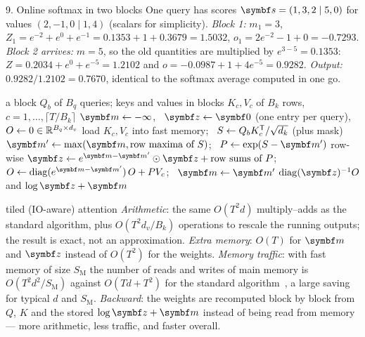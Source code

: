 \documentclass[11pt]{article}
\newcommand{\zv}{\vect{z}}
\newcommand{\diag}{\operatorname{diag}}
\begin{document}
\begin{worked}{9. Online softmax in two blocks}
One query has scores $\vect{s} = (1, 3, 2 \mid 5, 0)$ for values $(2, -1, 0 \mid 1, 4)$ (scalars for simplicity).
\emph{Block 1:} $m_1 = 3$, $Z_1 = e^{-2} + e^0 + e^{-1} = 0.1353 + 1 + 0.3679 = 1.5032$,
$o_1 = 2e^{-2} - 1 + 0 = -0.7293$.
\emph{Block 2 arrives:} $m = 5$, so the old quantities are multiplied by $e^{3 - 5} = 0.1353$:
$Z = 0.2034 + e^0 + e^{-5} = 1.2102$ and $o = -0.0987 + 1 + 4e^{-5} = 0.9282$.
\emph{Output:} $0.9282/1.2102 = 0.7670$, identical to the softmax average computed in one go.
\end{worked}

\begin{algorithm}[htbp]
\caption{Tiled attention with an online softmax (forward pass, one block of queries)}\label{alg:flash}
\begin{algorithmic}[1]
\Require a block $Q_b$ of $B_q$ queries; keys and values in blocks $K_c, V_c$ of $B_k$ rows, $c = 1, \dots, \lceil T/B_k\rceil$
  \State $\vect{m} \gets -\infty$, \ $\zv \gets \vect{0}$ (one entry per query), \ $O \gets 0 \in \mathbb{R}^{B_q \times d_v}$
   
    \State load $K_c, V_c$ into fast memory; \ $S \gets Q_bK_c^{\mathsf{T}}/\sqrt{d_k}$ (plus mask) 
    \State $\vect{m}' \gets \max(\vect{m}, \text{row maxima of } S)$; \ $P \gets \exp(S - \vect{m}')$ row-wise
    \State $\zv \gets e^{\vect{m} - \vect{m}'} \odot \zv + \text{row sums of } P$; \
      $O \gets \diag(e^{\vect{m} - \vect{m}'})\,O + PV_c$; \ $\vect{m} \gets \vect{m}'$
  \EndFor
  \State \Return $\diag(\zv)^{-1}O$ and $\log\zv + \vect{m}$ 
\EndFunction
\end{algorithmic}
\end{algorithm}

\begin{runtime}{tiled (IO-aware) attention}
\emph{Arithmetic}: the same $O(T^2d)$ multiply--adds as the standard algorithm, plus $O(T^2d_v/B_k)$ operations to rescale
the running outputs; the result is
exact, not an approximation. \emph{Extra memory}: $O(T)$ for $\vect{m}$ and $\zv$ instead of $O(T^2)$ for the weights.
\emph{Memory traffic}: with fast memory of size $S_{\mathrm{M}}$ the number of reads and writes of main memory is
$O(T^2d^2/S_{\mathrm{M}})$ against $O(Td + T^2)$ for the standard algorithm~\cite{dao2022}, a large saving for typical $d$ and
$S_{\mathrm{M}}$. \emph{Backward}: the weights are recomputed block by block from $Q$, $K$ and the stored $\log\zv +
\vect{m}$ instead of being read from memory --- more arithmetic, less traffic, and faster overall.
\end{runtime}
\end{document}
